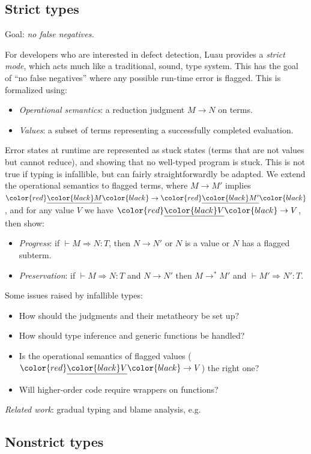 \documentclass[acmsmall]{acmart}
\newcommand{\squnder}[1]{\color{red}\underline{{\color{black}#1}}\color{black}}
\begin{document}
\subsection{Strict types}

Goal: \emph{no false negatives.}

For developers who are interested in defect detection, Luau provides a \emph{strict mode},
which acts much like a traditional, sound, type system. This has the goal of ``no false negatives''
where any possible run-time error is flagged. This is formalized using:
\begin{itemize}
\item \emph{Operational semantics}: a reduction judgment $M \rightarrow N$ on terms.
\item \emph{Values}: a subset of terms representing a successfully completed evaluation.
\end{itemize}
Error states at runtime are represented as stuck states (terms that are not
values but cannot reduce), and showing that no well-typed program is
stuck. This is not true if typing is infallible, but can fairly
straightforwardly be adapted. We extend the operational semantics to flagged terms,
where $M \rightarrow M'$ implies $\squnder{M} \rightarrow \squnder{M'}$, and
for any value $V$ we have $\squnder{V} \rightarrow V$, then show:
\begin{itemize}
\item \emph{Progress}: if ${} \vdash M \Rightarrow N : T$, then $N \rightarrow N'$ or $N$ is a value or $N$ has a flagged subterm.
\item \emph{Preservation}: if ${} \vdash M \Rightarrow N : T$ and $N \rightarrow N'$ then  $M \rightarrow^*M'$ and ${} \vdash M' \Rightarrow N' : T$.
\end{itemize}
Some issues raised by infallible types:
\begin{itemize}
\item How should the judgments and their metatheory be set up?
\item How should type inference and generic functions be handled?
\item Is the operational semantics of flagged values
  ($\squnder{V} \rightarrow V$) the right one?
\item Will higher-order code require wrappers on functions? 
\end{itemize}
\emph{Related work}: gradual typing and blame analysis, e.g.~\cite{GradualTyping,WellTyped,Contracts}

\subsection{Nonstrict types}
\end{document}
